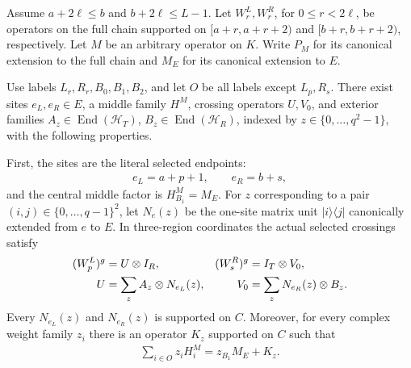\begin{lemma}
    \label{thm:selected_middle_fixed_physical_data}
    \leanok
    Assume $a+2\ell\le b$ and $b+2\ell\le L-1$.
    Let $W^L_r,W^R_r$, for $0\le r<2\ell$, be operators on the full chain
    supported on $[a+r,a+r+2)$ and
    $[b+r,b+r+2)$, respectively.
    Let $M$ be an arbitrary operator on $K$. Write $P_M$ for its canonical
    extension to the full chain and $M_E$ for its canonical extension to $E$.

    Use labels $L_r,R_r,B_0,B_1,B_2$, and let $O$ be all labels except
    $L_p,R_s$. There exist sites $e_L,e_R\in E$, a middle family $H^M$,
    crossing operators $U,V_0$, and exterior families
    $A_z\in\operatorname{End}(\mathcal H_T)$,
    $B_z\in\operatorname{End}(\mathcal H_R)$, indexed by
    $z\in\{0,\ldots,q^2-1\}$, with the following properties.

    First, the sites are the literal selected endpoints:
    \begin{align}
        e_L=a+p+1,\qquad e_R=b+s,
        \label{eq:selected_middle_endpoints}
    \end{align}
    and the central middle factor is $H^M_{B_1}=M_E$.
    For $z$ corresponding to a pair $(i,j)\in\{0,\ldots,q-1\}^2$,
    let $N_e(z)$ be the one-site matrix unit $|i\rangle\langle j|$
    canonically extended from $e$ to $E$.
    In three-region coordinates the actual selected crossings satisfy
    \begin{align}
        (W^L_p)^g & =U\otimes I_R,                 &
        (W^R_s)^g & =I_T\otimes V_0,\notag           \\
        U         & =\sum_z A_z\otimes N_{e_L}(z), &
        V_0       & =\sum_z N_{e_R}(z)\otimes B_z.
        \label{eq:selected_middle_fixed_crossings}
    \end{align}
    Every $N_{e_L}(z)$ and $N_{e_R}(z)$ is supported on $C$.
    Moreover, for every complex weight family $z_i$ there is an operator
    $K_z$ supported on $C$ such that
    \begin{align}
        \sum_{i\in O}z_iH^M_i=z_{B_1}M_E+K_z.
        \label{eq:selected_middle_weighted_sum}
    \end{align}


\end{lemma}
